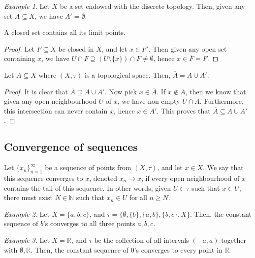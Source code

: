 \documentclass[11pt]{article}
\newcommand{\R}{\mathbb{R}}
\newcommand{\N}{\mathbb{N}}
\theoremstyle{definition}
\theoremstyle{remark}
\newtheorem*{example}{Example}
\numberwithin{equation}{section}
\begin{document}
    \begin{example}
        Let $X$ be a set endowed with the discrete topology. Then, given any set $A
        \subseteq X$, we have $A' = \emptyset$.
    \end{example}

    \begin{lemma}
        A closed set contains all its limit points.
    \end{lemma}
    \begin{proof}
        Let $F \subseteq X$ be closed in $X$, and let $x \in F'$. Then given any open
        set containing $x$, we have $U \cap F \supseteq (U\setminus\{x\}) \cap F \neq
        \emptyset$, hence $x \in \overline{F} = F$.
    \end{proof}

    \begin{lemma}
        Let $A \subseteq X$ where $(X, \tau)$ is a topological space. Then,
        $\overline{A} = A \cup A'$.
    \end{lemma}
    \begin{proof}
        It is clear that $\overline{A} \supseteq A \cup A'$. Now pick $x \in
        \overline{A}$. If $x \notin A$, then we know that given any open
        neighbourhood $U$ of $x$, we have non-empty $U \cap A$. Furthermore, this
        intersection can never contain $x$, hence $x \in A'$. This proves that
        $\overline{A} \subseteq A \cup A'$.
    \end{proof}


    \subsection{Convergence of sequences}

    \begin{definition}
        Let $\{x_n\}_{n = 1}^\infty$ be a sequence of points from $(X, \tau)$, and
        let $x \in X$. We say that this sequence converges to $x$, denoted $x_n \to
        x$, if every open neighbourhood of $x$ contains the tail of this sequence. In
        other words, given $U \in \tau$ such that $x \in U$, there must exist $N \in
        \N$ such that $x_n \in U$ for all $n \geq N$.
    \end{definition}

    \begin{example}
        Let $X = \{a, b, c\}$, and $\tau = \{\emptyset, \{b\}, \{a, b\}, \{b, c\},
        X\}$. Then, the constant sequence of $b$'s converges to all three points $a,
        b, c$.
    \end{example}
    \begin{example}
        Let $X = \R$, and $\tau$ be the collection of all intervals $(-a, a)$
        together with $\emptyset, \R$. Then, the constant sequence of $0$'s converges
        to every point in $\R$.
    \end{example}
\end{document}
